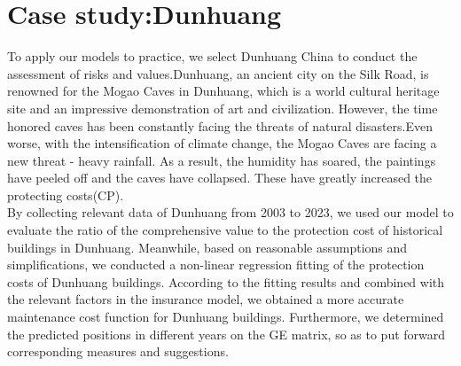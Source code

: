 \documentclass[12pt]{article}
\begin{document}
\section{Case study:Dunhuang}
\hspace{2em}To apply our models to practice, we select Dunhuang China to conduct the assessment of risks and values.Dunhuang, an ancient city on the Silk Road, is renowned for the Mogao Caves in Dunhuang, which is a world cultural heritage site and an impressive demonstration of art and civilization. However, the time honored caves has been constantly facing the threats of natural disasters.Even worse, with the intensification of climate change, the Mogao Caves are facing a new threat - heavy rainfall. As a result, the humidity has soared, the paintings have peeled off and the caves have collapsed. These have greatly increased the protecting costs(CP).\\
\hspace{2em}By collecting relevant data of Dunhuang from 2003 to 2023, we used our model to evaluate the ratio of the comprehensive value to the protection cost of historical buildings in Dunhuang. Meanwhile, based on reasonable assumptions and simplifications, we conducted a non-linear regression fitting of the protection costs of Dunhuang buildings. According to the fitting results and combined with the relevant factors in the insurance model, we obtained a more accurate maintenance cost function for Dunhuang buildings. Furthermore, we determined the predicted positions in different years on the GE matrix, so as to put forward corresponding measures and suggestions.
\end{document}
